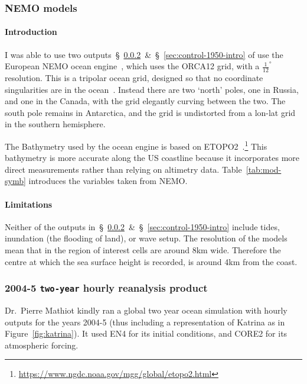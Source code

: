 \subsubsection{NEMO models}
\paragraph{Introduction}
\label{sec:nemo}
I was able to use two outputs~§~\ref{sec:rean-prod}~\&~§~\ref{sec:control-1950-intro}
of use the European NEMO ocean engine~\cite{madec2015nemo}, which uses the ORCA12 grid, with a  $\frac{1}{12}^{\circ}$
resolution.
This is a tripolar ocean grid, designed so that no coordinate singularities are in the ocean~\cite{madec1996global}.
Instead there are two `north' poles, one in Russia, and one in the Canada,
with the grid elegantly curving between the two.
The south pole remains in Antarctica, and the grid is undistorted from a lon-lat
 grid in the southern hemisphere.

 The Bathymetry used by the ocean engine is based on
 ETOPO2~\cite{lecointre2011definition,noaa20062}.\footnote{\url{https://www.ngdc.noaa.gov/mgg/global/etopo2.html}}
 This bathymetry is more accurate along the US coastline because it incorporates
 more direct measurements rather than relying on altimetry data. Table~\ref{tab:mod-symb}
 introduces the variables taken from NEMO.



\paragraph{Limitations}

Neither of the outputs in~§~\ref{sec:rean-prod}~\&~§~\ref{sec:control-1950-intro}
include tides, inundation (the flooding of land), or wave setup.
The resolution of the models mean that in the region of interest cells are around
8km wide. Therefore the centre at which the sea surface height is recorded,
is around 4km from the coast.

\subsubsection{2004-5 \texttt{two-year} hourly reanalysis product}
\label{sec:rean-prod}
Dr.~Pierre Mathiot kindly ran a global two year ocean simulation with
hourly outputs for the years 2004-5 (thus including a representation of Katrina as
in Figure~\ref{fig:katrina}).
It used EN4 for its initial conditions,
and CORE2 for its atmospheric forcing.

